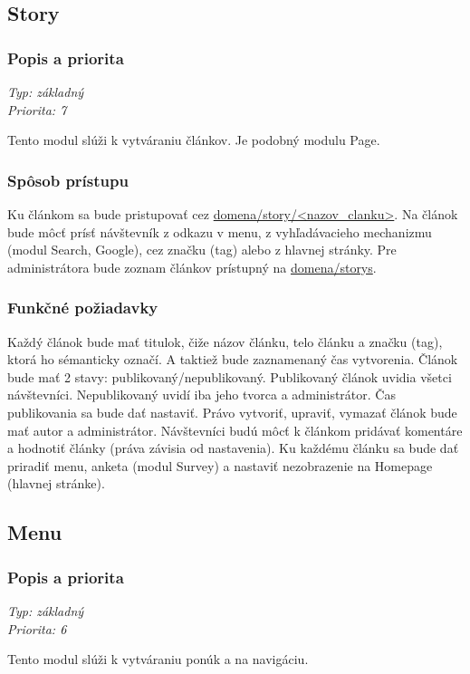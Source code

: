 \documentclass[a4paper,titlepage,11pt]{article}
\begin{document}
\subsection{Story}
\subsubsection{Popis a priorita}
\begin{flushleft}
 \emph{Typ: základný}\\
 \emph{Priorita: 7}\\
\end{flushleft}
Tento modul slúži k vytváraniu článkov. Je podobný modulu Page. 
\subsubsection{Spôsob prístupu}
Ku článkom sa bude pristupovať cez \url{domena/story/<nazov_clanku>}.
Na článok bude môcť prísť návštevník z odkazu v menu, z vyhľadávacieho mechanizmu (modul Search, Google), cez značku (tag) alebo z hlavnej stránky. 
Pre administrátora bude zoznam článkov prístupný na \url{domena/storys}.
\subsubsection{Funkčné požiadavky}
Každý článok bude mať titulok, čiže názov článku, telo článku a značku (tag), ktorá ho sémanticky označí. 
A taktiež bude zaznamenaný čas vytvorenia. Článok bude mať 2 stavy: publikovaný\slash nepublikovaný. Publikovaný článok uvidia všetci návštevníci. 
Nepublikovaný uvidí iba jeho tvorca a administrátor. Čas publikovania sa bude dať nastaviť. 
Právo vytvoriť, upraviť, vymazať článok bude mať autor a administrátor. 
Návštevníci budú môcť k článkom pridávať komentáre a hodnotiť články (práva závisia od nastavenia). 
Ku každému článku sa bude dať priradiť menu, anketa (modul Survey) a nastaviť nezobrazenie na Homepage (hlavnej stránke).

\subsection{Menu}
\subsubsection{Popis a priorita}
\begin{flushleft}
 \emph{Typ: základný}\\
 \emph{Priorita: 6}\\
\end{flushleft}
Tento modul slúži k vytváraniu ponúk a na navigáciu.
\end{document}
